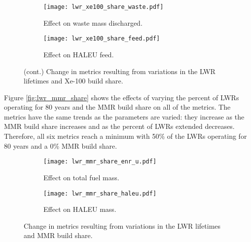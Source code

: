 \begin{figure}
    \ContinuedFloat    
    \begin{subfigure}[h!]{0.48\textwidth}
        \centering
        \texttt{[image: lwr\_xe100\_share\_waste.pdf]}
        \caption{Effect on waste mass discharged.}
        \label{fig:lwr_xe100_share_waste}
    \end{subfigure}
    \hfill
    \begin{subfigure}[h!]{0.48\textwidth}
        \centering
        \texttt{[image: lwr\_xe100\_share\_feed.pdf]}
        \caption{Effect on HALEU feed.}
        \label{fig:lwr_xe100_share_feed}
    \end{subfigure}
    \caption{(cont.) Change in metrics resulting from variations in the 
    LWR lifetimes and Xe-100 build share.}
    \label{fig:lwr_xe100_share}
\end{figure}

Figure \ref{fig:lwr_mmr_share} shows the effects of varying the 
percent of \glspl{LWR} operating for 80 years and the \gls{MMR} 
build share on all of the metrics. The metrics have the same trends 
as the parameters are varied: they increase as the \gls{MMR} build 
share increases and as the percent of \glspl{LWR} extended 
decreases. Therefore, all six metrics reach a minimum with 50\% of 
the \glspl{LWR} operating for 80 years and a 0\% \gls{MMR} build 
share. 

\begin{figure}
    \begin{subfigure}[h!]{0.48\textwidth}
        \centering
        \texttt{[image: lwr\_mmr\_share\_enr\_u.pdf]}
        \caption{Effect on total fuel mass.}
        \label{fig:lwr_mmr_share_enr_u}
    \end{subfigure}
    \hfill
    \begin{subfigure}[h!]{0.48\textwidth}
        \centering
        \texttt{[image: lwr\_mmr\_share\_haleu.pdf]}
        \caption{Effect on HALEU mass.}
        \label{fig:lwr_mmr_share_haleu}
    \end{subfigure}
    \caption{Change in metrics resulting from variations in the 
    LWR lifetimes and MMR build share.}
\end{figure}

